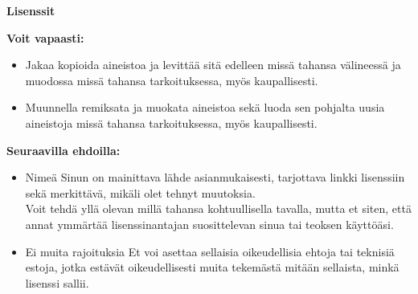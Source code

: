 
\pagestyle{empty}

{\large\textbf{Lisenssit}}



\textbf{Voit vapaasti:}
\begin{itemize}
  \item Jakaa {\textemdash} kopioida aineistoa ja levittää sitä edelleen missä tahansa välineessä ja muodossa missä tahansa tarkoituksessa, myös kaupallisesti.
  \item Muunnella {\textemdash} remiksata ja muokata aineistoa sekä luoda sen pohjalta uusia aineistoja missä tahansa tarkoituksessa, myös kaupallisesti.
\end{itemize}

\textbf{Seuraavilla ehdoilla:}
\begin{itemize}
  \item Nimeä {\textemdash} Sinun on mainittava lähde asianmukaisesti, tarjottava linkki lisenssiin sekä merkittävä, mikäli olet tehnyt muutoksia.\\ Voit tehdä yllä olevan millä tahansa kohtuullisella tavalla, mutta et siten, että annat ymmärtää lisenssinantajan suosittelevan sinua tai teoksen käyttöäsi.
  \item Ei muita rajoituksia {\textemdash} Et voi asettaa sellaisia oikeudellisia ehtoja tai teknisiä estoja, jotka estävät oikeudellisesti muita tekemästä mitään sellaista, minkä lisenssi sallii.
\end{itemize}

\restoregeometry
\clearpage
